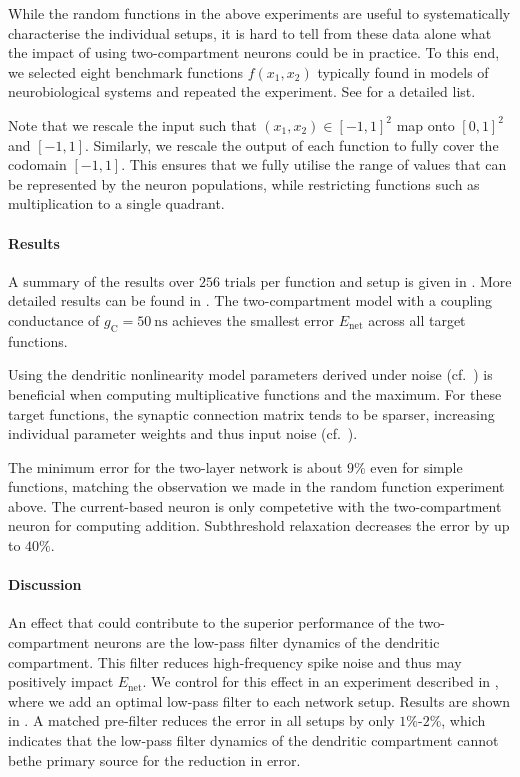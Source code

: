 While the random functions in the above experiments are useful to systematically characterise the individual setups, it is hard to tell from these data alone what the impact of using two-compartment neurons could be in practice.
To this end, we selected eight benchmark functions $f(x_1, x_2)$ typically found in models of neurobiological systems and repeated the experiment.
See  for a detailed list.

Note that we rescale the input such that $(x_1, x_2) \in [-1, 1]^2$ map onto $[0, 1]^2$ and $[-1, 1]$.
Similarly, we rescale the output of each function to fully cover the codomain $[-1, 1]$.
This ensures that we fully utilise the range of values that can be represented by the neuron populations, while restricting functions such as multiplication to a single quadrant.

\paragraph{Results}
A summary of the results over $256$ trials per function and setup is given in .
More detailed results can be found in .
The two-compartment model with a coupling conductance of $g_\mathrm{C} = \SI{50}{\nano\second}$ achieves the smallest error $E_\mathrm{net}$ across all target functions.

Using the dendritic nonlinearity model parameters derived under noise (cf.~) is beneficial when computing multiplicative functions and the maximum.
For these target functions, the synaptic connection matrix tends to be sparser, increasing individual parameter weights and thus input noise (cf.~).

The minimum error for the two-layer network is about $9\%$ even for simple functions, matching the observation we made in the random function experiment above.
The current-based neuron is only competetive with the two-compartment neuron for computing addition.
Subthreshold relaxation decreases the error by up to $40\%$.

\paragraph{Discussion}
An effect that could contribute to the superior performance of the two-compartment neurons are the low-pass filter dynamics of the dendritic compartment.
This filter reduces high-frequency spike noise and thus may positively impact $E_\mathrm{net}$.
We control for this effect in an experiment described in , where we add an optimal low-pass filter to each network setup.
Results are shown in .
A matched pre-filter reduces the error in all setups by only $1\%$-$2\%$, which indicates that the low-pass filter dynamics of the dendritic compartment cannot bethe primary source for the reduction in error.

